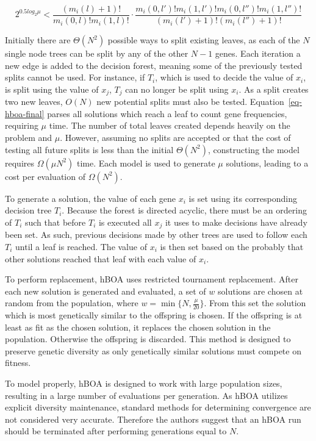 \documentclass[twoside]{article}
\begin{document}
\begin{equation}
  2^{0.5 log_2\mu} < \frac{(m_i(l) + 1)!}{m_i(0, l)!m_i(1,l)!} \cdot
  \frac{m_i(0, l')!m_i(1,l')!m_i(0, l'')!m_i(1,l'')!}{(m_i(l') + 1)!(m_i(l'') + 1)!}
  \label{eq-hboa-final}
\end{equation}

Initially there are $\Theta(N^2)$ possible ways to split existing leaves, as each of the $N$ single node
trees can be split by any of the other $N-1$ genes. Each iteration a new edge is added to the decision
forest, meaning some of the previously tested splits cannot be used. For instance, if $T_i$, which is used
to decide the value of $x_i$, is split using the value of $x_j$, $T_j$ can no longer be split using $x_i$.
As a split creates two new leaves, $O(N)$ new potential splits must also be tested. Equation~\ref{eq-hboa-final}
parses all solutions which reach a leaf to count gene frequencies, requiring $\mu$ time.
The number of total leaves created depends heavily on the problem and $\mu$.
However, assuming no splits are accepted or that the cost of testing all future splits is less than
the initial $\Theta(N^2)$, constructing the model requires $\Omega(\mu N^2)$ time. Each
model is used to generate $\mu$ solutions, leading to a cost per evaluation of $\Omega(N^2)$.

To generate a solution, the value of each gene $x_i$ is set using its corresponding decision tree $T_i$. Because
the forest is directed acyclic, there must be an ordering of $T_i$ such that before $T_i$ is executed all
$x_j$ it uses to make decisions have already been set. As such, previous decisions made by other trees
are used to follow each $T_i$ until a leaf is reached. The value of $x_i$ is then set based on the
probably that other solutions reached that leaf with each value of $x_i$.

To perform replacement, hBOA uses restricted tournament replacement. After each new solution is generated
and evaluated, a set of $w$ solutions are chosen at random from the population, where $w=\min\{N, \frac{\mu}{20}\}$.
From this set the solution which is most genetically similar to the offspring is chosen. If the offspring
is at least as fit as the chosen solution, it replaces the chosen solution in the population. Otherwise the
offspring is discarded. This method is designed to preserve genetic diversity as only genetically similar
solutions must compete on fitness.

To model properly, hBOA is designed to work with large population sizes, resulting in a large number of
evaluations per generation. As hBOA utilizes explicit diversity maintenance, standard methods for determining
convergence are not considered very accurate. Therefore the authors suggest that an hBOA run should be
terminated after performing generations equal to $N$.
\end{document}

